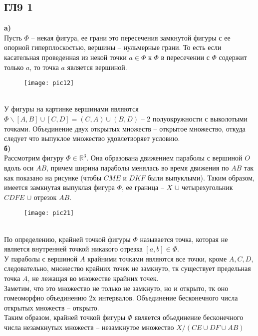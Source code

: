 \subsection*{ГЛ9 1}
\textbf{a)}\\
Пусть $\Phi$ -- некая фигура, ее грани это пересечения замкнутой фигуры с ее опорной гиперплоскостью, вершины -- нульмерные грани. То есть если касательная проведенная из некой точки $a \in \Phi$ к $\Phi$ в пересечении с $\Phi$ содержит только $a$, то точка $a$ является вершиной.
\begin{figure}[h!]
	\texttt{[image: pic12]}
\end{figure}\\
У фигуры на картинке вершинами являются $\Phi\backslash [A, B] \cup [C, D] = (C, A) \cup (B, D)$ -- 2 полуокружности с выколотыми точками. Объединение двух открытых множеств -- открытое множество, откуда следует что выпуклое множество удовлетворяет условию.\\


\vskip 0.3in
\noindent
\textbf{б)}\\
Рассмотрим фигуру $\Phi \in \mathbb{R}^3$. Она образована движением параболы с вершиной $O$ вдоль оси $AB$, причем ширина параболы менялась во время движения по $AB$ так как показано на рисунке (чтобы $CME$ и $DKF$ были выпуклыми). Таким образом, имеется замкнутая выпуклая фигура $\Phi$, ее граница --
$X$ $\cup$ четырехугольник $CDFE$ $\cup$ отрезок $AB$.\\
\begin{figure}[h]
	\texttt{[image: pic21]}
\end{figure}\\
По определению, крайней точкой фигуры $\Phi$ называется точка, которая не является внутренней точкой никакого отрезка $[a,b] \in \Phi$.\\
У параболы с вершиной $A$ крайними точками являются все точки, кроме $A, C, D$, следовательно, множество крайних точек не замкнуто, тк существует предельная точка $A$, не лежащая во множестве крайних точек.\\
Заметим, что это множество не только не замкнуто, но и открыто, тк оно гомеоморфно объединению 2х интервалов. Объединение бесконечного числа открытых множеств -- открыто.\\
Таким образом, крайней точкой фигуры $\Phi$ является объединение бесконечного числа незамкнутых множеств -- незамкнутое множество $X \slash (CE \cup DF \cup AB)$\\